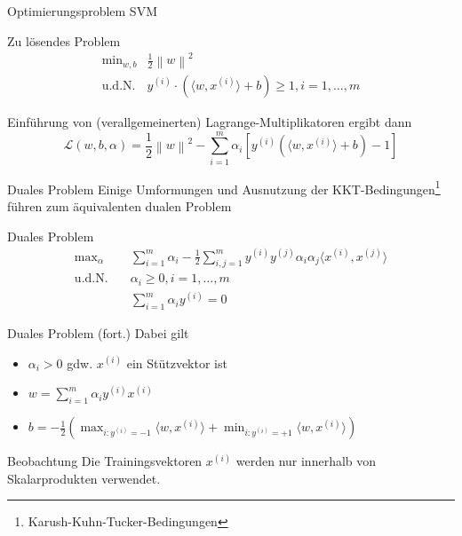 \documentclass[xcolor={dvipsnames,svgnames},draft]{beamer}
\newcommand{\inner}[2]{\langle{} #1, #2 \rangle{}}
\newcommand{\norm}[1]{\left\lVert#1\right\rVert}
\begin{document}
\begin{frame}{Optimierungsproblem SVM}
  \begin{exampleblock}{Zu lösendes Problem}
    \[
      \begin{array}{rl}
        \text{min}_{w,b} & \frac{1}{2}\norm{w}^2 \\
        \text{u.d.N.} & y^{(i)} \cdot (\inner{w}{x^{(i)}} + b) \geq 1, i = 1, \ldots, m
      \end{array}
    \]
  \end{exampleblock}
Einführung von (verallgemeinerten) Lagrange-Multiplikatoren ergibt dann
\[
  \mathcal{L}(w,b,\alpha) = \frac{1}{2}\norm{w}^2 
    - \sum_{i=1}^m{\alpha_i \left[ y^{(i)}(\inner{w}{x^{(i)}} + b) - 1 \right]}
\]
\end{frame}

\begin{frame}{Duales Problem}
  Einige Umformungen und Ausnutzung der KKT-Bedingungen\footnote{Karush-Kuhn-Tucker-Bedingungen} führen zum äquivalenten
  dualen Problem

  \begin{exampleblock}{Duales Problem}
    \vspace{-1em}
    \begin{align*}
        \text{max}_{\alpha} \quad& \sum_{i=1}^m\alpha_i 
                              - \frac{1}{2}\sum_{i,j=1}^m y^{(i)}y^{(j)}\alpha_i\alpha_j\inner{x^{(i)}}{x^{(j)}}  \\
        \text{u.d.N.} \quad& \alpha_i \geq 0, i = 1, \ldots, m \\
                            & \sum_{i=1}^m \alpha_i y^{(i)} = 0
    \end{align*}
  \end{exampleblock}
\end{frame}

\begin{frame}{Duales Problem (fort.)}
  Dabei gilt
  \begin{itemize}
    \item $\alpha_i > 0$ gdw. $x^{(i)}$ ein Stützvektor ist
    \item $w = \sum_{i=1}^m \alpha_i y^{(i)} x^{(i)}$
    \item $b = -\frac{1}{2}(\max_{i:y^{(i)}=-1} \inner{w}{x^{(i)}} + \min_{i:y^{(i)}=+1} \inner{w}{x^{(i)}} )$
  \end{itemize}

  \begin{block}{Beobachtung}
    Die Trainingsvektoren $x^{(i)}$ werden nur innerhalb von
    Skalarprodukten verwendet.
  \end{block}
\end{frame}
\end{document}
